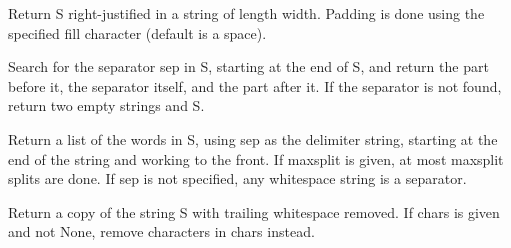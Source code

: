 \documentclass[letterpaper,10pt,english]{sphinxmanual}
\begin{document}
\begin{fulllineitems}
\begin{fulllineitems}
\end{fulllineitems}


\begin{fulllineitems}
\label{api_reference:textblob_de.blob.Word.rjust}
Return S right-justified in a string of length width. Padding is
done using the specified fill character (default is a space).

\end{fulllineitems}


\begin{fulllineitems}
\label{api_reference:textblob_de.blob.Word.rpartition}
Search for the separator sep in S, starting at the end of S, and return
the part before it, the separator itself, and the part after it.  If the
separator is not found, return two empty strings and S.

\end{fulllineitems}


\begin{fulllineitems}
\label{api_reference:textblob_de.blob.Word.rsplit}
Return a list of the words in S, using sep as the
delimiter string, starting at the end of the string and
working to the front.  If maxsplit is given, at most maxsplit
splits are done. If sep is not specified, any whitespace string
is a separator.

\end{fulllineitems}


\begin{fulllineitems}
\label{api_reference:textblob_de.blob.Word.rstrip}
Return a copy of the string S with trailing whitespace removed.
If chars is given and not None, remove characters in chars instead.

\end{fulllineitems}


\end{fulllineitems}
\end{document}
